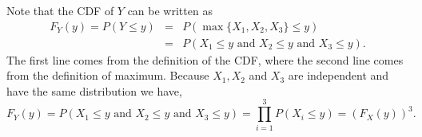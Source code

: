 \documentclass[
]{article}
\begin{document}
\begin{enumerate}
  Note that the CDF of \(Y\) can be written as
  \begin{align*}
   F_Y(y) = P(Y \leq y ) & = & P\left( \max \{ X_1, X_2, X_3 \} \leq y\right) \\
                         & = & P( X_1 \leq y \text{ and } X_2 \leq y \text{ and } X_3 \leq y).
   \end{align*}
  The first line comes from the definition of the CDF, where the second line comes from the definition of maximum. Because \(X_1, X_2\) and \(X_3\) are independent and have the same distribution we have,
  \[F_Y(y)=P( X_1 \leq y \text{ and } X_2 \leq y \text{ and } X_3 \leq y) =  \prod_{i = 1}^{3} P(X_i \leq y) = \left( F_X(y) \right)^3.\]
\end{enumerate}
\end{document}
